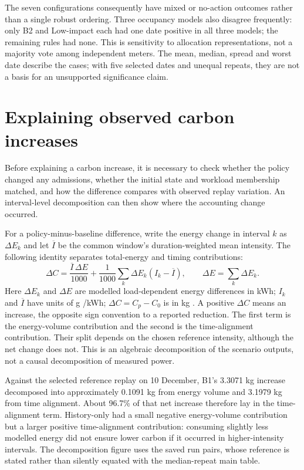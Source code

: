 The seven configurations consequently have mixed or no-action outcomes rather than a single robust ordering. Three occupancy models also disagree frequently: only B2 and Low-impact each had one date positive in all three models; the remaining rules had none. This is sensitivity to allocation representations, not a majority vote among independent meters. The mean, median, spread and worst date describe the cases; with five selected dates and unequal repeats, they are not a basis for an unsupported significance claim.
\FloatBarrier

\section{Explaining observed carbon increases}\label{sec:carbon-increases}
Before explaining a carbon increase, it is necessary to check whether the policy changed any admissions, whether the initial state and workload membership matched, and how the difference compares with observed replay variation. An interval-level decomposition can then show where the accounting change occurred.

For a policy-minus-baseline difference, write the energy change in interval $k$ as $\Delta E_k$ and let $\overline I$ be the common window's duration-weighted mean intensity. The following identity separates total-energy and timing contributions:
\begin{equation}\label{eq:decomposition}
\Delta C=\frac{\overline I\,\Delta E}{1000}
+\frac{1}{1000}\sum_k\Delta E_k(I_k-\overline I),
\qquad \Delta E=\sum_k\Delta E_k.
\end{equation}
Here $\Delta E_k$ and $\Delta E$ are modelled load-dependent energy differences in kWh; $I_k$ and $\overline I$ have units of g \co/kWh; $\Delta C=C_p-C_0$ is in kg \co. A positive $\Delta C$ means an increase, the opposite sign convention to a reported reduction. The first term is the energy-volume contribution and the second is the time-alignment contribution. Their split depends on the chosen reference intensity, although the net change does not. This is an algebraic decomposition of the scenario outputs, not a causal decomposition of measured power.

Against the selected reference replay on 10 December, B1's 3.3071 kg increase decomposed into approximately 0.1091 kg from energy volume and 3.1979 kg from time alignment. About 96.7\% of that net increase therefore lay in the time-alignment term. History-only had a small negative energy-volume contribution but a larger positive time-alignment contribution: consuming slightly less modelled energy did not ensure lower carbon if it occurred in higher-intensity intervals. The decomposition figure uses the saved run pairs, whose reference is stated rather than silently equated with the median-repeat main table.

\FloatBarrier

